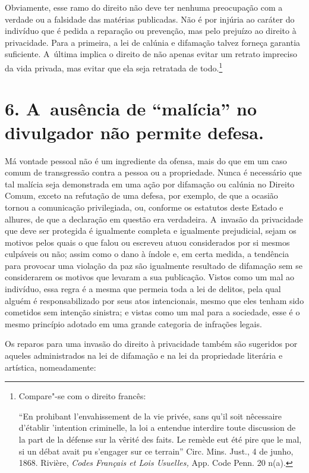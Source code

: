 Obviamente, esse ramo do direito não deve ter nenhuma preocupação com a
verdade ou a falsidade das matérias publicadas. Não é por injúria ao
caráter do indivíduo que é pedida a reparação ou prevenção, mas pelo
prejuízo ao direito à privacidade. Para a primeira, a lei de calúnia e
difamação talvez forneça garantia suficiente. A~última implica o direito
de não apenas evitar um retrato impreciso da vida privada, mas evitar
que ela seja retratada de todo.\footnote{Compare"-se com o direito
  francês:

  ``En prohibant l'envahissement de la vie privée, sans qu'il soit
  nêcessaire d'établir 'intention criminelle, la loi a entendue
  interdire toute discussion de la part de la défense sur la vêrité des
  faits. Le remède eut été pire que le mal, si un débat avait pu
  s'engager sur ce terrain'' Circ. Mins. Just., 4 de junho, 1868.
  Rivière, \emph{Codes Français et Lois Usuelles,} App. Code Penn. 20
  n(a).}

\section{6. A~ausência de ``malícia'' no divulgador não permite defesa.}

Má vontade pessoal não é um ingrediente da ofensa, mais do que em um
caso comum de transgressão contra a pessoa ou a propriedade. Nunca é
necessário que tal malícia seja demonstrada em uma ação por difamação ou
calúnia no Direito Comum, exceto na refutação de uma defesa, por
exemplo, de que a ocasião tornou a comunicação privilegiada, ou,
conforme os estatutos deste Estado e alhures, de que a declaração em
questão era verdadeira. A~invasão da privacidade que deve ser protegida
é igualmente completa e igualmente prejudicial, sejam os motivos pelos
quais o que falou ou escreveu atuou considerados por si mesmos culpáveis
ou não; assim como o dano à índole e, em certa medida, a tendência para
provocar uma violação da paz são igualmente resultado de difamação sem
se considerarem os motivos que levaram a sua publicação. Vistos como um
mal ao indivíduo, essa regra é a mesma que permeia toda a lei de
delitos, pela qual alguém é responsabilizado por seus atos intencionais,
mesmo que eles tenham sido cometidos sem intenção sinistra; e vistas
como um mal para a sociedade, esse é o mesmo princípio adotado em uma
grande categoria de infrações legais.

Os reparos para uma invasão do direito à privacidade também são
sugeridos por aqueles administrados na lei de difamação e na lei da
propriedade literária e artística, nomeadamente:

